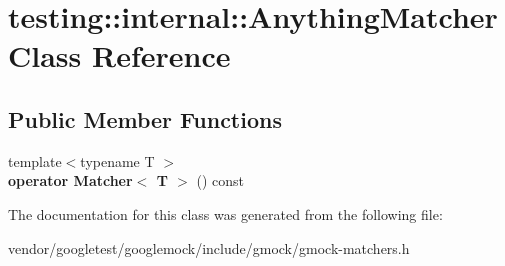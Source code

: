 \hypertarget{classtesting_1_1internal_1_1_anything_matcher}{}\section{testing\+:\+:internal\+:\+:Anything\+Matcher Class Reference}
\label{classtesting_1_1internal_1_1_anything_matcher}
\subsection*{Public Member Functions}
\begin{DoxyCompactItemize}
\item 
\mbox{\label{classtesting_1_1internal_1_1_anything_matcher_ae98ebd3352f996a7fb01679917365474}} 
{\footnotesize template$<$typename T $>$ }\\{\bfseries operator Matcher$<$ T $>$} () const
\end{DoxyCompactItemize}


The documentation for this class was generated from the following file\+:\begin{DoxyCompactItemize}
\item 
vendor/googletest/googlemock/include/gmock/gmock-\/matchers.\+h\end{DoxyCompactItemize}
